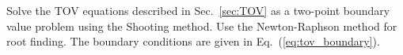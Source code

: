 

Solve the TOV equations described in Sec.~\ref{sec:TOV} as a two-point boundary value problem using the Shooting method. Use the Newton-Raphson method for root finding. The boundary conditions are given in Eq.~(\ref{eq:tov_boundary}).

